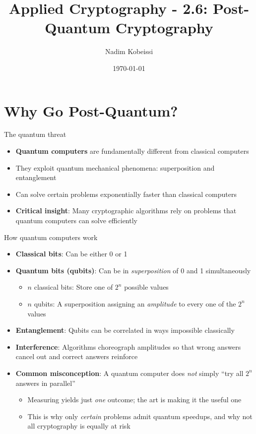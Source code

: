 \ifdefined\PRESENTATION\else\PassOptionsToClass{handout}{beamer}\fi\documentclass[aspectratio=169, lualatex]{beamer}
\title{Applied Cryptography - 2.6: Post-Quantum Cryptography}
\author{Nadim Kobeissi}
\institute{Symbolic Software}
\date{\today}
\begin{document}
\begin{frame}[plain]
	\titlepage
\end{frame}

\section{Why Go Post-Quantum?}

\begin{frame}{The quantum threat}
	\begin{itemize}
		\item \textbf{Quantum computers} are fundamentally different from classical computers
		\item They exploit quantum mechanical phenomena: superposition and entanglement
		\item Can solve certain problems exponentially faster than classical computers
		\item \textbf{Critical insight}: Many cryptographic algorithms rely on problems that quantum computers can solve efficiently
	\end{itemize}
\end{frame}

\begin{frame}{How quantum computers work}
	\begin{itemize}
		\item \textbf{Classical bits}: Can be either 0 or 1
		\item \textbf{Quantum bits (qubits)}: Can be in \textit{superposition} of 0 and 1 simultaneously
		      \begin{itemize}
			      \item $n$ classical bits: Store one of $2^n$ possible values
			      \item $n$ qubits: A superposition assigning an \textit{amplitude} to every one of the $2^n$ values
		      \end{itemize}
		\item \textbf{Entanglement}: Qubits can be correlated in ways impossible classically
		\item \textbf{Interference}: Algorithms choreograph amplitudes so that wrong answers cancel out and correct answers reinforce
		\item \textbf{Common misconception}: A quantum computer does \textit{not} simply ``try all $2^n$ answers in parallel''
		      \begin{itemize}
			      \item Measuring yields just \textit{one} outcome; the art is making it the useful one
			      \item This is why only \textit{certain} problems admit quantum speedups, and why not all cryptography is equally at risk
		      \end{itemize}
	\end{itemize}
\end{frame}
\end{document}
